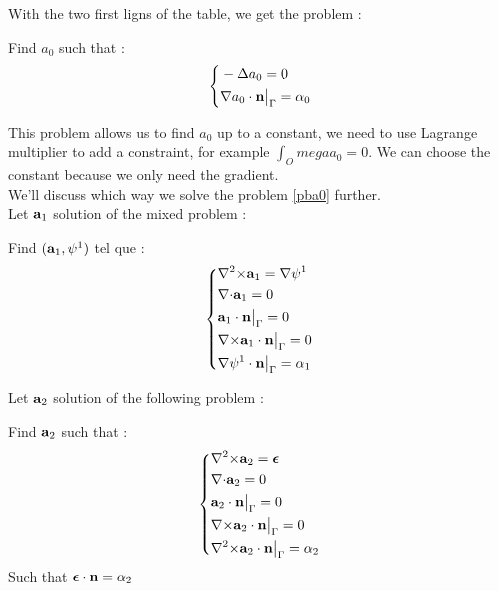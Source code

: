 With the two first ligns of the table, we get the problem :
\begin{pb}\label{pba0}
Find $a_0$ such that :
\begin{equation*}
\left\{\begin{aligned}
&-{\Delta} a_0 = 0\\
&{\nabla} a_0\cdot {\mathbf{n}}{\big\rvert_{\Gamma}}=\alpha_0
\end{aligned}\right.
\end{equation*}\end{pb}
This problem allows us to find $a_0$ up to a constant, we need to use Lagrange multiplier to add a constraint, for example $\int_Omega a_0=0$. We can choose the constant because we only need the gradient.\\
We'll discuss which way we solve the problem \ref{pba0} further.\\

Let ${\mathbf{a}}_1$ solution of the mixed problem :
\begin{pb}\label{pba1}
Find $({\mathbf{a}}_1,\psi^1)$ tel que :
\begin{equation*}
\left\{\begin{aligned}
&{\nabla^2\times} {\mathbf{a}}_1 = {\nabla}\psi^1\\
&{\nabla\cdot} {\mathbf{a}}_1 = 0\\
&{\mathbf{a}}_1\cdot {\mathbf{n}}{\big\rvert_{\Gamma}} = 0\\
&{\nabla\times} {\mathbf{a}}_1\cdot {\mathbf{n}}{\big\rvert_{\Gamma}} = 0\\
&{\nabla}\psi^1\cdot {\mathbf{n}}{\big\rvert_{\Gamma}} = \alpha_1
\end{aligned}\right.
\end{equation*}\end{pb}

Let ${\mathbf{a}}_2$ solution of the following problem :
\begin{pb}\label{pba2}
  Find ${\mathbf{a}}_2$ such that :
  \begin{equation*}
    \left\{\begin{aligned}
    &{\nabla^2\times}{\mathbf{a}}_2 = \bm{\epsilon}\\
    &{\nabla\cdot} {\mathbf{a}}_2 = 0\\
    &{\mathbf{a}}_2\cdot{\mathbf{n}}{\big\rvert_{\Gamma}} = 0\\
    &{\nabla\times}{\mathbf{a}}_2\cdot{\mathbf{n}}{\big\rvert_{\Gamma}} = 0\\
    &{\nabla^2\times}{\mathbf{a}}_2\cdot{\mathbf{n}}{\big\rvert_{\Gamma}} = \alpha_2
    \end{aligned}\right.
  \end{equation*}
  Such that $\bm{\epsilon}\cdot{\mathbf{n}} = \alpha_2$
\end{pb}

